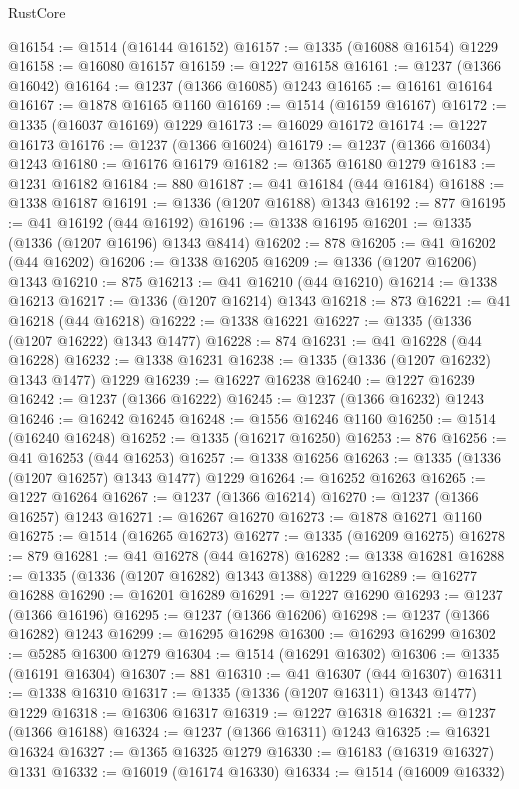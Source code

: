 \begin{lexlean}{RustCore}
\begin{coremodule}
@16154 := @1514 (@16144 @16152)
@16157 := @1335 (@16088 @16154) @1229
@16158 := @16080 @16157
@16159 := @1227 @16158
@16161 := @1237 (@1366 @16042)
@16164 := @1237 (@1366 @16085) @1243
@16165 := @16161 @16164
@16167 := @1878 @16165 @1160
@16169 := @1514 (@16159 @16167)
@16172 := @1335 (@16037 @16169) @1229
@16173 := @16029 @16172
@16174 := @1227 @16173
@16176 := @1237 (@1366 @16024)
@16179 := @1237 (@1366 @16034) @1243
@16180 := @16176 @16179
@16182 := @1365 @16180 @1279
@16183 := @1231 @16182
@16184 := 880
@16187 := @41 @16184 (@44 @16184)
@16188 := @1338 @16187
@16191 := @1336 (@1207 @16188) @1343
@16192 := 877
@16195 := @41 @16192 (@44 @16192)
@16196 := @1338 @16195
@16201 := @1335 (@1336 (@1207 @16196) @1343 @8414)
@16202 := 878
@16205 := @41 @16202 (@44 @16202)
@16206 := @1338 @16205
@16209 := @1336 (@1207 @16206) @1343
@16210 := 875
@16213 := @41 @16210 (@44 @16210)
@16214 := @1338 @16213
@16217 := @1336 (@1207 @16214) @1343
@16218 := 873
@16221 := @41 @16218 (@44 @16218)
@16222 := @1338 @16221
@16227 := @1335 (@1336 (@1207 @16222) @1343 @1477)
@16228 := 874
@16231 := @41 @16228 (@44 @16228)
@16232 := @1338 @16231
@16238 := @1335 (@1336 (@1207 @16232) @1343 @1477) @1229
@16239 := @16227 @16238
@16240 := @1227 @16239
@16242 := @1237 (@1366 @16222)
@16245 := @1237 (@1366 @16232) @1243
@16246 := @16242 @16245
@16248 := @1556 @16246 @1160
@16250 := @1514 (@16240 @16248)
@16252 := @1335 (@16217 @16250)
@16253 := 876
@16256 := @41 @16253 (@44 @16253)
@16257 := @1338 @16256
@16263 := @1335 (@1336 (@1207 @16257) @1343 @1477) @1229
@16264 := @16252 @16263
@16265 := @1227 @16264
@16267 := @1237 (@1366 @16214)
@16270 := @1237 (@1366 @16257) @1243
@16271 := @16267 @16270
@16273 := @1878 @16271 @1160
@16275 := @1514 (@16265 @16273)
@16277 := @1335 (@16209 @16275)
@16278 := 879
@16281 := @41 @16278 (@44 @16278)
@16282 := @1338 @16281
@16288 := @1335 (@1336 (@1207 @16282) @1343 @1388) @1229
@16289 := @16277 @16288
@16290 := @16201 @16289
@16291 := @1227 @16290
@16293 := @1237 (@1366 @16196)
@16295 := @1237 (@1366 @16206)
@16298 := @1237 (@1366 @16282) @1243
@16299 := @16295 @16298
@16300 := @16293 @16299
@16302 := @5285 @16300 @1279
@16304 := @1514 (@16291 @16302)
@16306 := @1335 (@16191 @16304)
@16307 := 881
@16310 := @41 @16307 (@44 @16307)
@16311 := @1338 @16310
@16317 := @1335 (@1336 (@1207 @16311) @1343 @1477) @1229
@16318 := @16306 @16317
@16319 := @1227 @16318
@16321 := @1237 (@1366 @16188)
@16324 := @1237 (@1366 @16311) @1243
@16325 := @16321 @16324
@16327 := @1365 @16325 @1279
@16330 := @16183 (@16319 @16327) @1331
@16332 := @16019 (@16174 @16330)
@16334 := @1514 (@16009 @16332)

\end{coremodule}
\end{lexlean}
